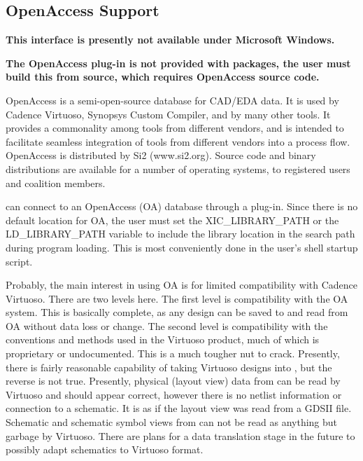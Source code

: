\begin{itemize}
\section{OpenAccess Support}
\label{oaplugin}

{\bf This interface is presently not available under Microsoft Windows.}

{\bf The OpenAccess plug-in is not provided with {\Xic} packages, the
user must build this from source, which requires OpenAccess source
code.  }

OpenAccess is a semi-open-source database for CAD/EDA data.  It is
used by Cadence Virtuoso, Synopsys Custom Compiler, and by many other
tools.  It provides a commonality among tools from different vendors,
and is intended to facilitate seamless integration of tools from
different vendors into a process flow.  OpenAccess is distributed by
Si2 ({\vt www.si2.org}).  Source code and binary distributions are
available for a number of operating systems, to registered users and
coalition members.

{\Xic} can connect to an OpenAccess (OA) database through a plug-in. 
Since there is no default location for OA, the user must set the {\vt
XIC\_LIBRARY\_PATH} or the {\vt LD\_LIBRARY\_PATH} variable to include
the library location in the search path during program loading.  This
is most conveniently done in the user's shell startup script.

Probably, the main interest in using OA is for limited compatibility
with Cadence Virtuoso.  There are two levels here.  The first level is
compatibility with the OA system.  This is basically complete, as any
{\Xic} design can be saved to and read from OA without data loss or
change.  The second level is compatibility with the conventions and
methods used in the Virtuoso product, much of which is proprietary or
undocumented.  This is a much tougher nut to crack.  Presently, there
is fairly reasonable capability of taking Virtuoso designs into
{\Xic}, but the reverse is not true.  Presently, physical (layout
view) data from {\Xic} can be read by Virtuoso and should appear
correct, however there is no netlist information or connection to a
schematic.  It is as if the layout view was read from a GDSII file. 
Schematic and schematic symbol views from {\Xic} can not be read as
anything but garbage by Virtuoso.  There are plans for a data
translation stage in the future to possibly adapt {\Xic} schematics to
Virtuoso format.


\end{itemize}
